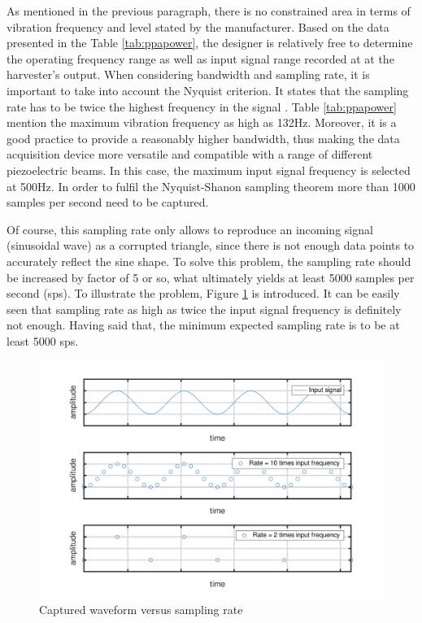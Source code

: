 \documentclass[12pt,a4paper]{article}
\begin{document}
As mentioned in the previous paragraph, there is no constrained area in terms of vibration frequency and level stated by the manufacturer. Based on the data presented in the Table \ref{tab:ppapower}, the designer is relatively free to determine the operating frequency range as well as input signal range recorded at at the harvester's output. When considering bandwidth and sampling rate, it is important to take into account the Nyquist criterion. It states that the sampling rate has to be twice the highest frequency in the signal \cite{ElEx}. Table \ref{tab:ppapower} mention the maximum vibration frequency as high as 132Hz. Moreover, it is a good practice to provide a reasonably higher bandwidth, thus making the data acquisition device more versatile and compatible with a range of different piezoelectric beams. In this case, the maximum input signal frequency is selected at 500Hz. In order to fulfil the Nyquist-Shanon sampling theorem more than 1000 samples per second need to be captured.
\par

Of course, this sampling rate only allows to reproduce an incoming signal (sinusoidal wave) as a corrupted triangle, since there is not enough data points to accurately reflect the sine shape. To solve this problem, the sampling rate should be increased by factor of 5 or so, what ultimately yields at least 5000 samples per second (sps). To illustrate the problem, Figure \ref{fig:nyquist} is introduced. It can be easily seen that sampling rate as high as twice the input signal frequency is definitely not enough. Having said that, the minimum expected sampling rate is to be at least 5000 sps.
\par

\begin{figure}[h!]
\includegraphics[scale=0.75]{nyquist.pdf}
\caption{Captured waveform versus sampling rate}
\label{fig:nyquist}
\end{figure}
\end{document}
